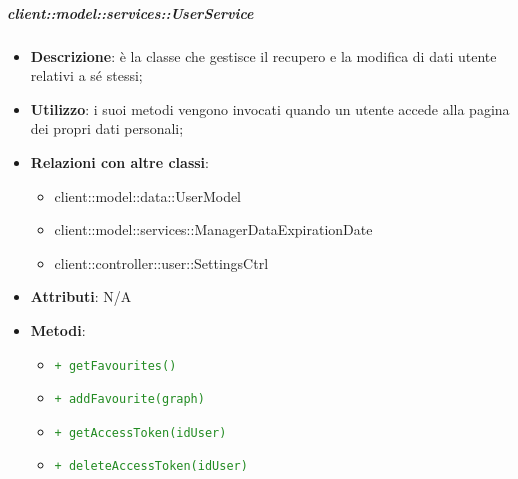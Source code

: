 		\subparagraph{client::model::services::UserService} %
		\label{subp:client_model_services_userservice}
			\begin{itemize}
				\item \textbf{Descrizione}: è la classe che gestisce il recupero e la modifica di dati utente relativi a sé stessi;
				\item \textbf{Utilizzo}: i suoi metodi vengono invocati quando un utente accede alla pagina dei propri dati personali;
				\item \textbf{Relazioni con altre classi}:
					\begin{itemize}
						\item client::model::data::UserModel
						\item client::model::services::ManagerDataExpirationDate
						\item client::controller::user::SettingsCtrl
					\end{itemize}
				\item \textbf{Attributi}: N/A
				\item \textbf{Metodi}:
				\begin{itemize}
					\item \textcolor{forestgreen}{\texttt{+ getFavourites()}}
					\item \textcolor{forestgreen}{\texttt{+ addFavourite(graph)}}
					\item \textcolor{forestgreen}{\texttt{+ getAccessToken(idUser)}}
					\item \textcolor{forestgreen}{\texttt{+ deleteAccessToken(idUser)}}
					
				\end{itemize}
			\end{itemize}

